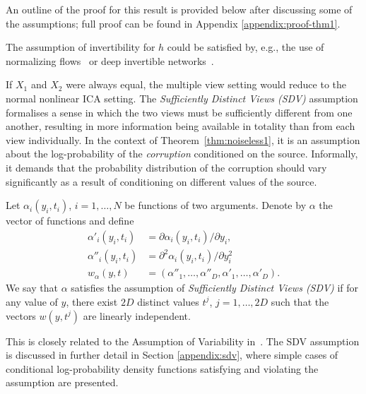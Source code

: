 An outline of the proof for this result is provided below after discussing some of the assumptions; full proof can be found in Appendix \ref{appendix:proof-thm1}.

The assumption of invertibility for $h$ could be satisfied by, e.g., the use of normalizing flows~\citep{rezende2015variational, chen2018neural} or deep invertible networks~\citep{jacobsen_hal-01712808}.


If $X_1$ and $X_2$ were always equal, the multiple view setting would reduce to the normal nonlinear ICA setting.
The \emph{Sufficiently Distinct Views (SDV)} assumption formalises a sense in which the two views must be sufficiently different from one another,
resulting in more information being available in totality than from each view individually.
In the context of Theorem~\ref{thm:noiseless1}, it is an assumption about the log-probability of the \emph{corruption} conditioned on the source.
Informally, it demands that the probability distribution of the corruption should vary significantly as a result of conditioning on different values of the source.

\medskip

\begin{definition}\label{suff_dist_assumption}
	Let $\alpha_i(y_i, t_i)$, $i=1,\ldots, N$ be functions of two arguments.
	Denote by $\alpha$ the vector of functions and define
	\begin{align}
	\alpha'_{i}(y_i, t_i)&= \partial \alpha_{i}(y_i, t_i)/\partial y_i, \label{eq:convention1}\\
	\alpha''_{i}(y_i, t_i)&=\partial^2 \alpha_{i}(y_i, t_i)/\partial y_i^2\, \label{eq:convention2}\\
	{w}_{\alpha}({y}, {t}) &= (\alpha''_{1}, \ldots, \alpha''_{D}, \alpha'_{1}, \ldots,\alpha'_{D}).
	\end{align}
	We say that ${\alpha}$ satisfies the assumption of \emph{Sufficiently Distinct Views (SDV)} if for any value of ${y}$, there exist $2D$ distinct values ${t}^j$, $j=1, \ldots, 2D$ such that the vectors ${w}({y},{t}^j)$ are linearly independent.
	\\    \end{definition}
This is closely related to the Assumption of Variability in~\cite{hyvarinen19a}.
The SDV assumption is discussed in further detail in Section \ref{appendix:sdv}, where simple cases of conditional log-probability density functions satisfying and violating the assumption are presented.

